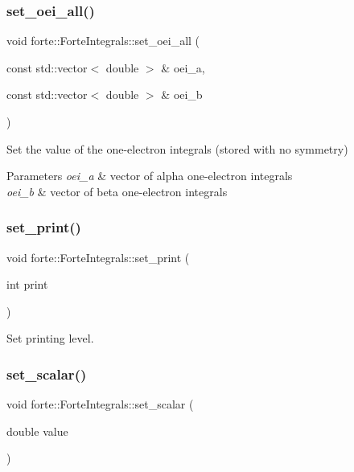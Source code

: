 \subsubsection{\texorpdfstring{set\+\_\+oei\+\_\+all()}{set\_oei\_all()}}
{\footnotesize\ttfamily void forte\+::\+Forte\+Integrals\+::set\+\_\+oei\+\_\+all (\begin{DoxyParamCaption}\item[{const std\+::vector$<$ double $>$ \&}]{oei\+\_\+a,  }\item[{const std\+::vector$<$ double $>$ \&}]{oei\+\_\+b }\end{DoxyParamCaption})}

Set the value of the one-\/electron integrals (stored with no symmetry) 
\begin{DoxyParams}{Parameters}
{\em oei\+\_\+a} & vector of alpha one-\/electron integrals \\
\hline
{\em oei\+\_\+b} & vector of beta one-\/electron integrals \\
\hline
\end{DoxyParams}
\mbox{\label{classforte_1_1_forte_integrals_af7a507eef40436e68fff042565249f94}} 
\subsubsection{\texorpdfstring{set\+\_\+print()}{set\_print()}}
{\footnotesize\ttfamily void forte\+::\+Forte\+Integrals\+::set\+\_\+print (\begin{DoxyParamCaption}\item[{int}]{print }\end{DoxyParamCaption})}



Set printing level. 

\mbox{\label{classforte_1_1_forte_integrals_aea3e933653ebe660401498969f5f834d}} 
\subsubsection{\texorpdfstring{set\+\_\+scalar()}{set\_scalar()}}
{\footnotesize\ttfamily void forte\+::\+Forte\+Integrals\+::set\+\_\+scalar (\begin{DoxyParamCaption}\item[{double}]{value }\end{DoxyParamCaption})}

